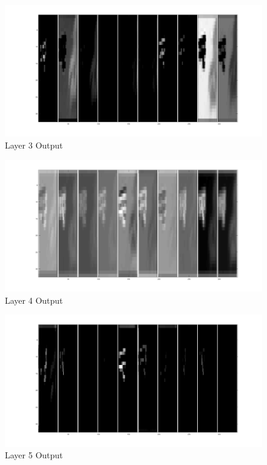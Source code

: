 \documentclass[11pt,english]{article}
\begin{document}
\begin{appendices}
\begin{figure}[h!]
  \caption{Layer 3 Output}
  \centering
    \includegraphics[width=\textwidth]{layer/3}
\end{figure}

\begin{figure}[h!]
  \caption{Layer 4 Output}
  \centering
    \includegraphics[width=\textwidth]{layer/4}
\end{figure}

\begin{figure}[h!]
  \caption{Layer 5 Output}
  \centering
    \includegraphics[width=\textwidth]{layer/5}
\end{figure}


\end{appendices}
\end{document}
